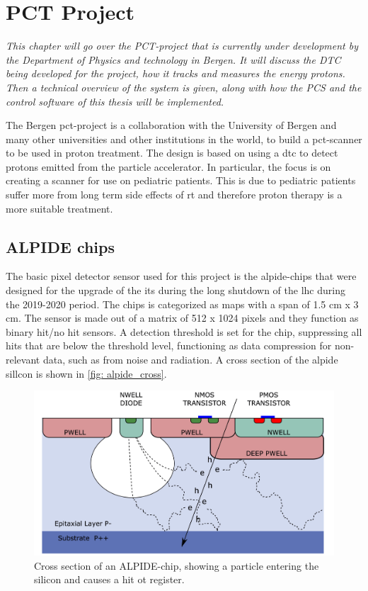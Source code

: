 \documentclass[main.tex]{subfiles}
\begin{document}
\section{PCT Project
}
\textit{This chapter will go over the PCT-project that is currently under development by the Department of Physics and technology in Bergen. It will discuss the DTC being developed for the project, how it tracks and measures the energy protons. Then a technical overview of the system is given, along with how the PCS and the control software of this thesis will be implemented.}

The Bergen \gls{pct}-project is a collaboration with the University of Bergen and many other universities and other institutions in the world, to build a \gls{pct}-scanner to be used in proton treatment. The design is based on using a \acrfull{dtc} to detect protons emitted from the particle accelerator. In particular, the focus is on creating a scanner for use on pediatric patients. This is due to pediatric patients suffer more from long term side effects of \gls{rt} and therefore proton therapy is a more suitable treatment.


\subsection{ALPIDE chips}

The basic pixel detector sensor used for this project is the \gls{alpide}-chips that were designed for the upgrade of the \gls{its} during the long shutdown of the \gls{lhc} during the 2019-2020 period. The chips is categorized as \gls{maps} with a span of 1.5 cm x 3 cm. The sensor is made out of a matrix of 512 x 1024 pixels and they function as binary hit/no hit sensors. A detection threshold is set for the chip, suppressing all hits that are below the threshold level, functioning as data compression for non-relevant data, such as from noise and radiation. A cross section of the \gls{alpide} sillcon is shown in \autoref{fig: alpide_cross}.

\begin{figure}[!htpb]
    \centering
    \includegraphics[width=12cm]{images/alpide_chip.jpg}
    \caption{Cross section of an ALPIDE-chip, showing a particle entering the silicon and causes a hit ot register.}
    \label{fig: alpide_cross}
\end{figure}
\FloatBarrier
\end{document}
